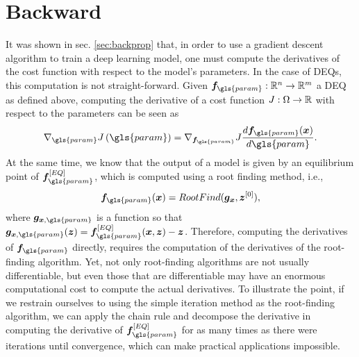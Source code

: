 \section{Backward}

It was shown in sec. \ref{sec:backprop} that, in order to use a gradient descent algorithm to train a deep learning model, one must compute the derivatives of the cost function with respect to the model's parameters.
In the case of \gls{DEQ}s, this computation is not straight-forward.
Given $\bm{f}_{\gls{param}}:\R^{n}\to \R^{m}$ a \gls{DEQ} as defined above, computing the derivative of a cost function $J:\Omega\to \mathbb{R}$ with respect to the parameters can be seen as \[
    \nabla_{\gls{param}} J\left( \gls{param} \right) = \nabla_{\bm{f}_{\gls{param}}} J \frac{d \bm{f}_{\gls{param}}(\bm{x})}{d\gls{param}}
.\] 
At the same time, we know that the output of a model is given by an equilibrium point of $\bm{f}_{\gls{param}}^{[EQ]}$, which is computed using a root finding method, i.e., \[
    \bm{f}_{\gls{param}}(\bm{x}) = RootFind(\bm{g}_{\bm{x}}, \bm{z}^{[0]})
,\] where $\bm{g}_{\bm{x},\gls{param}}$ is a function so that $\bm{g}_{\bm{x},\gls{param}}(\bm{z}) = \bm{f}_{\gls{param}}^{[EQ]}(\bm{x},\bm{z}) - \bm{z}$.
Therefore, computing the derivatives of $\bm{f}_{\gls{param}}$ directly, requires the computation of the derivatives of the root-finding algorithm.
Yet, not only root-finding algorithms are not usually differentiable, but even those that are differentiable may have an enormous computational cost to compute the actual derivatives.
To illustrate the point, if we restrain ourselves to using the simple iteration method as the root-finding algorithm, we can apply the chain rule and decompose the derivative in computing the derivative of $\bm{f}_{\gls{param}}^{[EQ]}$ for as many times as there were iterations until convergence, which can make practical applications impossible.

